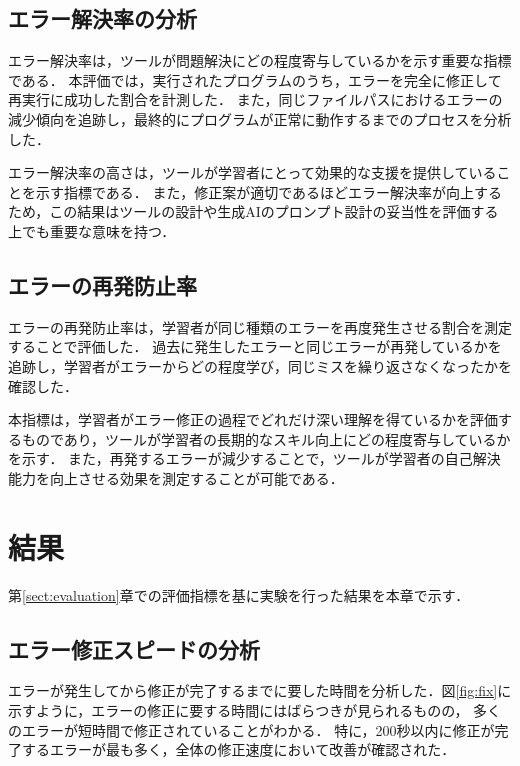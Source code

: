 \documentclass[12pt,twoside]{jbook}
\begin{document}
\section{エラー解決率の分析}
エラー解決率は，ツールが問題解決にどの程度寄与しているかを示す重要な指標である．
本評価では，実行されたプログラムのうち，エラーを完全に修正して再実行に成功した割合を計測した．
また，同じファイルパスにおけるエラーの減少傾向を追跡し，最終的にプログラムが正常に動作するまでのプロセスを分析した．

エラー解決率の高さは，ツールが学習者にとって効果的な支援を提供していることを示す指標である．
また，修正案が適切であるほどエラー解決率が向上するため，この結果はツールの設計や生成AIのプロンプト設計の妥当性を評価する上でも重要な意味を持つ．

\section{エラーの再発防止率}
エラーの再発防止率は，学習者が同じ種類のエラーを再度発生させる割合を測定することで評価した．
過去に発生したエラーと同じエラーが再発しているかを追跡し，学習者がエラーからどの程度学び，同じミスを繰り返さなくなったかを確認した．

本指標は，学習者がエラー修正の過程でどれだけ深い理解を得ているかを評価するものであり，ツールが学習者の長期的なスキル向上にどの程度寄与しているかを示す．
また，再発するエラーが減少することで，ツールが学習者の自己解決能力を向上させる効果を測定することが可能である．


\chapter{結果}
第\ref{sect:evaluation}章での評価指標を基に実験を行った結果を本章で示す．

\section{エラー修正スピードの分析}
エラーが発生してから修正が完了するまでに要した時間を分析した．図\ref{fig:fix}に示すように，エラーの修正に要する時間にはばらつきが見られるものの，
多くのエラーが短時間で修正されていることがわかる．
特に，200秒以内に修正が完了するエラーが最も多く，全体の修正速度において改善が確認された．
\end{document}
